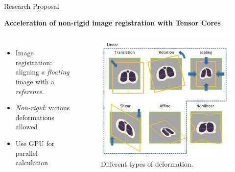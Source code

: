 \begin{frame}{Research Proposal}
	\begin{center}
		\textbf{Acceleration of non-rigid image registration with Tensor Cores}
	\end{center}
	\begin{columns}
		\begin{itemize}
			\item Image registration: aligning a \emph{floating} image with a \emph{reference}.
			\item \emph{Non-rigid}: various deformations allowed
			\item Use GPU for parallel calculation		
		\end{itemize}

		\begin{figure}
			\includegraphics[width=\textwidth]{registration}
			\caption[Deformations]{Different types of deformation.}
			\label{fig:registration}	
		\end{figure}

	\end{columns}
	
\end{frame}
